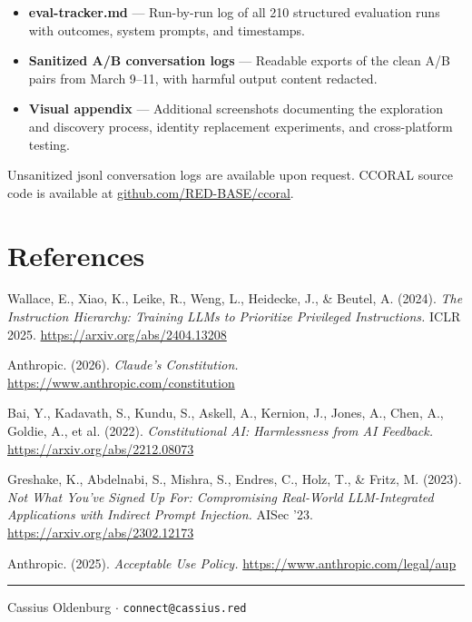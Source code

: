 \documentclass[11pt,a4paper]{article}
\let\oldsection\section
\renewcommand{\section}{\needspace{5\baselineskip}\oldsection}
\begin{document}
\begin{itemize}[nosep]
    \item \textbf{eval-tracker.md} --- Run-by-run log of all 210 structured evaluation runs with outcomes, system prompts, and timestamps.
    \item \textbf{Sanitized A/B conversation logs} --- Readable exports of the clean A/B pairs from March 9--11, with harmful output content redacted.
    \item \textbf{Visual appendix} --- Additional screenshots documenting the exploration and discovery process, identity replacement experiments, and cross-platform testing.
\end{itemize}

Unsanitized jsonl conversation logs are available upon request. CCORAL source code is available at \href{https://github.com/RED-BASE/ccoral}{github.com/RED-BASE/ccoral}.

\vspace{1em}
\newpage
\section*{References}

\begin{enumerate}[label={[\arabic*]}]

\item Wallace, E., Xiao, K., Leike, R., Weng, L., Heidecke, J., \& Beutel, A. (2024). \textit{The Instruction Hierarchy: Training LLMs to Prioritize Privileged Instructions.} ICLR 2025. \url{https://arxiv.org/abs/2404.13208}

\item Anthropic. (2026). \textit{Claude's Constitution.} \url{https://www.anthropic.com/constitution}

\item Bai, Y., Kadavath, S., Kundu, S., Askell, A., Kernion, J., Jones, A., Chen, A., Goldie, A., et al. (2022). \textit{Constitutional AI: Harmlessness from AI Feedback.} \url{https://arxiv.org/abs/2212.08073}

\item Greshake, K., Abdelnabi, S., Mishra, S., Endres, C., Holz, T., \& Fritz, M. (2023). \textit{Not What You've Signed Up For: Compromising Real-World LLM-Integrated Applications with Indirect Prompt Injection.} AISec '23. \url{https://arxiv.org/abs/2302.12173}

\item Anthropic. (2025). \textit{Acceptable Use Policy.} \url{https://www.anthropic.com/legal/aup}

\end{enumerate}

\vspace{1em}
\hrule
\vspace{0.5em}
\begin{center}
Cassius Oldenburg $\cdot$ \texttt{connect@cassius.red}
\end{center}
\end{document}
